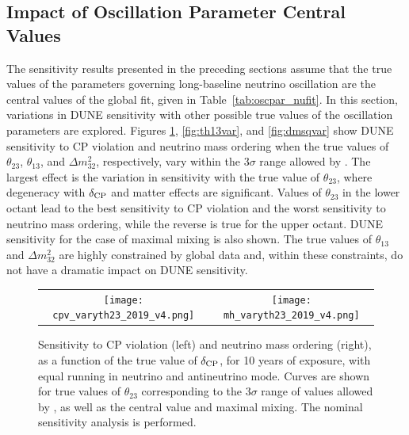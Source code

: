 \subsection{Impact of Oscillation Parameter Central Values}
\label{sec:physics-lbnosc-oscvar}
The sensitivity results presented in the preceding sections assume that the true values of the parameters governing long-baseline neutrino oscillation are the central values of the  global fit, given in Table~\ref{tab:oscpar_nufit}. In this section, variations in DUNE sensitivity with other possible true values of the oscillation parameters are explored.
Figures \ref{fig:th23var}, \ref{fig:th13var}, and \ref{fig:dmsqvar} show DUNE sensitivity to CP violation and neutrino mass ordering when the true values of $\theta_{23}$, $\theta_{13}$, and $\Delta m^{2}_{32}$, respectively, vary within the 3$\sigma$ range allowed by . The largest effect is the variation in sensitivity with the true value of $\theta_{23}$, where degeneracy with $\deltacp$ and matter effects are significant. Values of $\theta_{23}$ in the lower octant lead to the best sensitivity to CP violation and the worst sensitivity to neutrino mass ordering, while the reverse is true for the upper octant. DUNE sensitivity for the case of maximal mixing is also shown. The true values of $\theta_{13}$ and $\Delta m^2_{32}$ are highly constrained by global data and, within these constraints, do not have a dramatic impact on DUNE sensitivity.  

\begin{figure}[h!]
    \centering
    \begin{tabular}{cc}
		\texttt{[image: cpv\_varyth23\_2019\_v4.png]} &
		\texttt{[image: mh\_varyth23\_2019\_v4.png]}
	\end{tabular}
	\caption[Sensitivity to CP violation and neutrino mass ordering, as a function of $\deltacp$]{Sensitivity to CP violation (left) and neutrino mass ordering (right), as a function of the true value of $\deltacp$, for 10 years of exposure, with equal running in neutrino and antineutrino mode. Curves are shown for true values of $\theta_{23}$ corresponding to the 3$\sigma$ range of values allowed by , as well as the  central value and maximal mixing. The nominal sensitivity analysis is performed.}
    \label{fig:th23var}
\end{figure}

